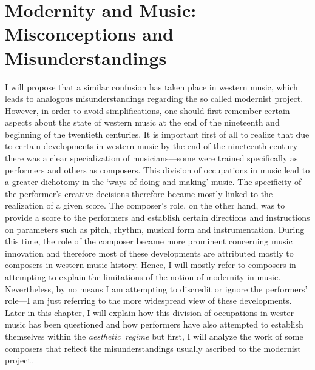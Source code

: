 \section{Modernity and Music: Misconceptions and Misunderstandings}

I will propose that a similar confusion has taken place in western music, which leads to analogous misunderstandings regarding the so called modernist project. However, in order to avoid simplifications, one should first remember certain aspects about the state of western music at the end of the nineteenth and beginning of the twentieth centuries. It is important first of all to realize that due to certain developments in western music by the end of the nineteenth century there was a clear specialization of musicians---some were trained specifically as performers and others as composers. This division of occupations in music lead to a greater dichotomy in the `ways of doing and making' music. The specificity of the performer's creative decisions therefore became mostly linked to the realization of a given score. The composer's role, on the other hand, was to provide a score to the performers and establish certain directions and instructions on parameters such as pitch, rhythm, musical form and instrumentation. During this time, the role of the composer became more prominent concerning music innovation and therefore most of these developments are attributed mostly to composers in western music history. Hence, I will mostly refer to composers in attempting to explain the limitations of the notion of modernity in music. Nevertheless, by no means I am attempting to discredit or ignore the performers' role---I am just referring to the more widespread view of these developments. Later in this chapter, I will explain how this division of occupations in wester music has been questioned and how performers have also attempted to establish themselves within the \mbox{\emph{aesthetic regime}} but first, I will analyze the work of some composers that reflect the misunderstandings usually ascribed to the modernist project. 

